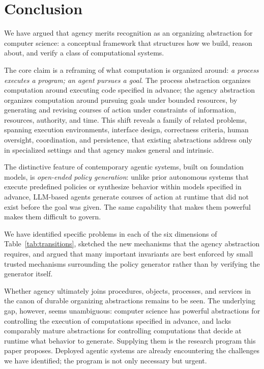 \documentclass[11pt]{article}
\begin{document}
\section{Conclusion}
\label{sec:conclusion}

We have argued that agency merits recognition as an organizing abstraction for computer science: a conceptual framework that structures how we build, reason about, and verify a class of computational systems.

The core claim is a reframing of what computation is organized around: \textit{a process executes a program; an agent pursues a goal}. The process abstraction organizes computation around executing code specified in advance; the agency abstraction organizes computation around pursuing goals under bounded resources, by generating and revising courses of action under constraints of information, resources, authority, and time. This shift reveals a family of related problems, spanning execution environments, interface design, correctness criteria, human oversight, coordination, and persistence, that existing abstractions address only in specialized settings and that agency makes general and intrinsic.

The distinctive feature of contemporary agentic systems, built on foundation models, is \textit{open-ended policy generation}: unlike prior autonomous systems that execute predefined policies or synthesize behavior within models specified in advance, LLM-based agents generate courses of action at runtime that did not exist before the goal was given. The same capability that makes them powerful makes them difficult to govern.

We have identified specific problems in each of the six dimensions of Table~\ref{tab:transitions}, sketched the new mechanisms that the agency abstraction requires, and argued that many important invariants are best enforced by small trusted mechanisms surrounding the policy generator rather than by verifying the generator itself.

Whether agency ultimately joins procedures, objects, processes, and services in the canon of durable organizing abstractions remains to be seen. The underlying gap, however, seems unambiguous: computer science has powerful abstractions for controlling the execution of computations specified in advance, and lacks comparably mature abstractions for controlling computations that decide at runtime what behavior to generate. Supplying them is the research program this paper proposes. Deployed agentic systems are already encountering the challenges we have identified; the program is not only necessary but urgent.
\end{document}
